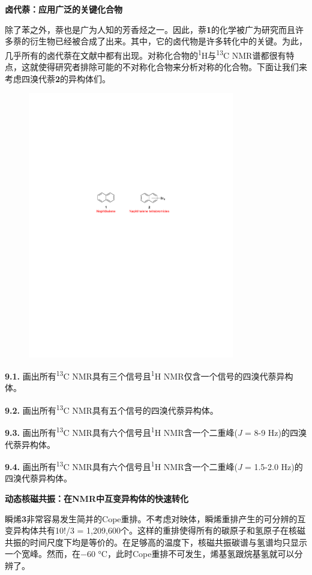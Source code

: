 \noindent\textbf{卤代萘：应用广泛的关键化合物}

除了苯之外，萘也是广为人知的芳香烃之一。因此，萘\textbf{1}的化学被广为研究而且许多萘的衍生物已经被合成了出来。其中，它的卤代物是许多转化中的关键。为此，几乎所有的卤代萘在文献中都有出现。对称化合物的\textsuperscript{1}H与\textsuperscript{13}C
NMR谱都很有特点，这就使得研究者排除可能的不对称化合物来分析对称的化合物。下面让我们来考虑四溴代萘\textbf{2}的异构体们。

\begin{figure}[h]
	\centering
	\includegraphics[width=9cm]{./pic/t9-1.pdf}
\end{figure}


\noindent\textbf{9.1.} 画出所有\textsuperscript{13}C
NMR具有三个信号且\textsuperscript{1}H NMR仅含一个信号的四溴代萘异构体。

\noindent\textbf{9.2.} 画出所有\textsuperscript{13}C
NMR具有五个信号的四溴代萘异构体。

\noindent\textbf{9.3.} 画出所有\textsuperscript{13}C
NMR具有六个信号且\textsuperscript{1}H NMR含一个二重峰(\emph{J} = 8-9
Hz)的四溴代萘异构体。

\noindent\textbf{9.4.} 画出所有\textsuperscript{13}C
NMR具有六个信号且\textsuperscript{1}H NMR含一个二重峰(\emph{J} = 1.5-2.0
Hz)的四溴代萘异构体。

\noindent\textbf{动态核磁共振：在NMR中互变异构体的快速转化}

瞬烯\textbf{3}非常容易发生简并的Cope重排。不考虑对映体，瞬烯重排产生的可分辨的互变异构体共有10!/3 = 1,209,600个。这样的重排使得所有的碳原子和氢原子在核磁共振的时间尺度下均是等价的。在足够高的温度下，核磁共振碳谱与氢谱均只显示一个宽峰。然而，在−60 °C，此时Cope重排不可发生，烯基氢跟烷基氢就可以分辨了。

